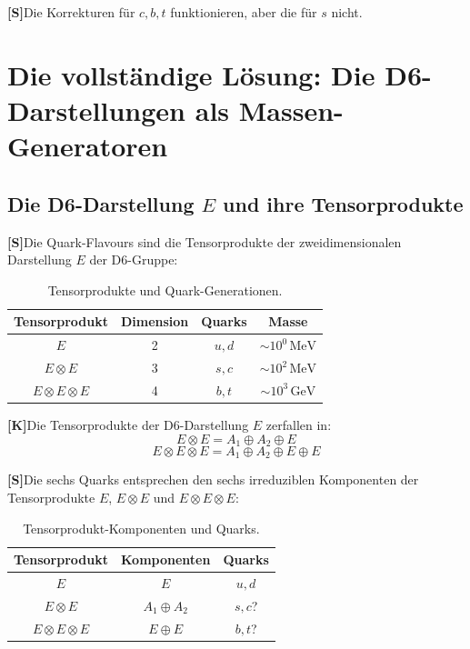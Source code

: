 \documentclass[11pt,a4paper]{article}
\newcommand{\Kstatus}{\textbf{[K]}}
\newcommand{\Sstatus}{\textbf{[S]}}
\begin{document}
	\Sstatus Die Korrekturen für $c, b, t$ funktionieren, aber die für $s$ nicht.
	
	\section{Die vollständige Lösung: Die D6-Darstellungen als Massen-Generatoren}
	
	\subsection{Die D6-Darstellung $E$ und ihre Tensorprodukte}
	
	\Sstatus Die Quark-Flavours sind die Tensorprodukte der zweidimensionalen Darstellung $E$ der D6-Gruppe:
	
	\begin{table}[h!]
		\centering
		\caption{Tensorprodukte und Quark-Generationen.}
		\label{tab:tensor_products}
		\begin{tabular}{c c c c}
			\toprule
			\textbf{Tensorprodukt} & \textbf{Dimension} & \textbf{Quarks} & \textbf{Masse} \\
			\midrule
			$E$ & 2 & $u, d$ & $\sim 10^0\,\text{MeV}$ \\
			$E \otimes E$ & 3 & $s, c$ & $\sim 10^2\,\text{MeV}$ \\
			$E \otimes E \otimes E$ & 4 & $b, t$ & $\sim 10^3\,\text{GeV}$ \\
			\bottomrule
		\end{tabular}
	\end{table}
	
	\Kstatus Die Tensorprodukte der D6-Darstellung $E$ zerfallen in:
	\begin{equation}
		E \otimes E = A_1 \oplus A_2 \oplus E
	\end{equation}
	\begin{equation}
		E \otimes E \otimes E = A_1 \oplus A_2 \oplus E \oplus E
	\end{equation}
	
	\Sstatus Die sechs Quarks entsprechen den sechs irreduziblen Komponenten der Tensorprodukte $E$, $E \otimes E$ und $E \otimes E \otimes E$:
	
	\begin{table}[h!]
		\centering
		\caption{Tensorprodukt-Komponenten und Quarks.}
		\label{tab:tensor_components}
		\begin{tabular}{c c c}
			\toprule
			\textbf{Tensorprodukt} & \textbf{Komponenten} & \textbf{Quarks} \\
			\midrule
			$E$ & $E$ & $u, d$ \\
			$E \otimes E$ & $A_1 \oplus A_2$ & $s, c$? \\
			$E \otimes E \otimes E$ & $E \oplus E$ & $b, t$? \\
			\bottomrule
		\end{tabular}
	\end{table}
	
\end{document}
